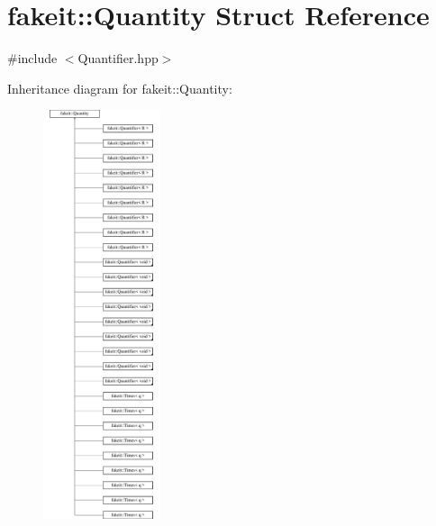 \hypertarget{structfakeit_1_1Quantity}{}\section{fakeit\+::Quantity Struct Reference}
\label{structfakeit_1_1Quantity}


{\ttfamily \#include $<$Quantifier.\+hpp$>$}

Inheritance diagram for fakeit\+::Quantity\+:\begin{figure}[H]
\begin{center}
\leavevmode
\includegraphics[height=12.000000cm]{structfakeit_1_1Quantity}
\end{center}
\end{figure}

